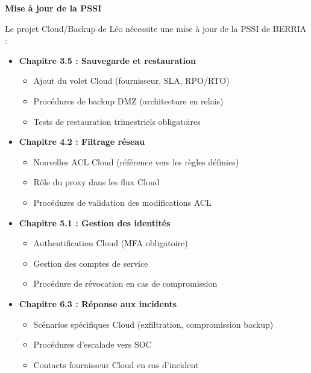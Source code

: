 \medskip

\noindent \textbf{Mise à jour de la PSSI}

Le projet Cloud/Backup de Léo nécessite une mise à jour de la PSSI de BERRIA :

\begin{itemize}
  \item \textbf{Chapitre 3.5 : Sauvegarde et restauration}
  \begin{itemize}
    \item Ajout du volet Cloud (fournisseur, SLA, RPO/RTO)
    \item Procédures de backup DMZ (architecture en relais)
    \item Tests de restauration trimestriels obligatoires
  \end{itemize}

  \newpage
  
  \item \textbf{Chapitre 4.2 : Filtrage réseau}
  \begin{itemize}
    \item Nouvelles ACL Cloud (référence vers les règles définies)
    \item Rôle du proxy dans les flux Cloud
    \item Procédures de validation des modifications ACL
  \end{itemize}
  
  \item \textbf{Chapitre 5.1 : Gestion des identités}
  \begin{itemize}
    \item Authentification Cloud (MFA obligatoire)
    \item Gestion des comptes de service
    \item Procédure de révocation en cas de compromission
  \end{itemize}
  
  \item \textbf{Chapitre 6.3 : Réponse aux incidents}
  \begin{itemize}
    \item Scénarios spécifiques Cloud (exfiltration, compromission backup)
    \item Procédures d'escalade vers SOC
    \item Contacts fournisseur Cloud en cas d'incident
  \end{itemize}
\end{itemize}

\medskip

